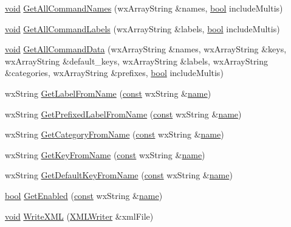 \begin{DoxyCompactItemize}
$$\hyperlink{sound_8c_ae35f5844602719cf66324f4de2a658b3}{void} \hyperlink{class_command_manager_a4e320882c82377e66eff4ef3741ca087}{Get\+All\+Command\+Names} (wx\+Array\+String \&names, \hyperlink{mac_2config_2i386_2lib-src_2libsoxr_2soxr-config_8h_abb452686968e48b67397da5f97445f5b}{bool} include\+Multis)
\item 
\hyperlink{sound_8c_ae35f5844602719cf66324f4de2a658b3}{void} \hyperlink{class_command_manager_aa73180ba26f6d9afe964aa3780059e8f}{Get\+All\+Command\+Labels} (wx\+Array\+String \&labels, \hyperlink{mac_2config_2i386_2lib-src_2libsoxr_2soxr-config_8h_abb452686968e48b67397da5f97445f5b}{bool} include\+Multis)
\item 
\hyperlink{sound_8c_ae35f5844602719cf66324f4de2a658b3}{void} \hyperlink{class_command_manager_a86355446e93df7147e1d2417bb19bd10}{Get\+All\+Command\+Data} (wx\+Array\+String \&names, wx\+Array\+String \&keys, wx\+Array\+String \&default\+\_\+keys, wx\+Array\+String \&labels, wx\+Array\+String \&categories, wx\+Array\+String \&prefixes, \hyperlink{mac_2config_2i386_2lib-src_2libsoxr_2soxr-config_8h_abb452686968e48b67397da5f97445f5b}{bool} include\+Multis)
\item 
wx\+String \hyperlink{class_command_manager_a78cc34bd55778e57270d8d96ed79ded5}{Get\+Label\+From\+Name} (\hyperlink{getopt1_8c_a2c212835823e3c54a8ab6d95c652660e}{const} wx\+String \&\hyperlink{lib_2expat_8h_a1b49b495b59f9e73205b69ad1a2965b0}{name})
\item 
wx\+String \hyperlink{class_command_manager_a116a7c89a1d44392273a913a95ccf082}{Get\+Prefixed\+Label\+From\+Name} (\hyperlink{getopt1_8c_a2c212835823e3c54a8ab6d95c652660e}{const} wx\+String \&\hyperlink{lib_2expat_8h_a1b49b495b59f9e73205b69ad1a2965b0}{name})
\item 
wx\+String \hyperlink{class_command_manager_ab5813e2a389c7c26fefa9d6c7634d4a5}{Get\+Category\+From\+Name} (\hyperlink{getopt1_8c_a2c212835823e3c54a8ab6d95c652660e}{const} wx\+String \&\hyperlink{lib_2expat_8h_a1b49b495b59f9e73205b69ad1a2965b0}{name})
\item 
wx\+String \hyperlink{class_command_manager_a13bb29a96c656f6a5bf4a43e4bd015e3}{Get\+Key\+From\+Name} (\hyperlink{getopt1_8c_a2c212835823e3c54a8ab6d95c652660e}{const} wx\+String \&\hyperlink{lib_2expat_8h_a1b49b495b59f9e73205b69ad1a2965b0}{name})
\item 
wx\+String \hyperlink{class_command_manager_a193b48019dfbd4e381a21d95d69eb68f}{Get\+Default\+Key\+From\+Name} (\hyperlink{getopt1_8c_a2c212835823e3c54a8ab6d95c652660e}{const} wx\+String \&\hyperlink{lib_2expat_8h_a1b49b495b59f9e73205b69ad1a2965b0}{name})
\item 
\hyperlink{mac_2config_2i386_2lib-src_2libsoxr_2soxr-config_8h_abb452686968e48b67397da5f97445f5b}{bool} \hyperlink{class_command_manager_a5e6589936636f93bc6ade0d11ace8cbf}{Get\+Enabled} (\hyperlink{getopt1_8c_a2c212835823e3c54a8ab6d95c652660e}{const} wx\+String \&\hyperlink{lib_2expat_8h_a1b49b495b59f9e73205b69ad1a2965b0}{name})
\item 
\hyperlink{sound_8c_ae35f5844602719cf66324f4de2a658b3}{void} \hyperlink{class_command_manager_aada5ab6e32b495a57cc1463c37178228}{Write\+X\+ML} (\hyperlink{class_x_m_l_writer}{X\+M\+L\+Writer} \&xml\+File)
\end{DoxyCompactItemize}
